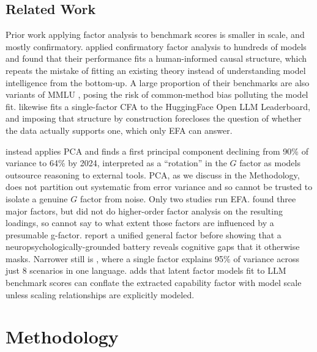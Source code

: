 \documentclass{article} %
\begin{document}
\hypertarget{related-work}{%
\subsection{Related Work}\label{related-work}}

Prior work applying factor analysis to benchmark scores is smaller in scale, and mostly confirmatory. \citet{ilicagignac2024} applied confirmatory factor analysis to hundreds of models and found that
their performance fits a human-informed causal structure, which repeats the mistake of fitting an existing theory instead of understanding model intelligence from the bottom-up. A large proportion of
their benchmarks are also variants of MMLU \citep{hendrycks2021}, posing the risk of common-method bias polluting the model fit. \citet{federiakin2025} likewise fits a single-factor CFA to the
HuggingFace Open LLM Leaderboard, and imposing that structure by construction forecloses the question of whether the data actually supports one, which only EFA can answer.

\citet{krakauer2026} instead applies PCA and finds a first principal component declining from 90\% of variance to 64\% by 2024, interpreted as a ``rotation'' in the \(G\) factor as models outsource
reasoning to external tools. PCA, as we discuss in the Methodology, does not partition out systematic from error variance and so cannot be trusted to isolate a genuine \(G\) factor from noise. Only
two studies run EFA. \citet{burnell2023} found three major factors, but did not do higher-order factor analysis on the resulting loadings, so cannot say to what extent those factors are influenced by
a presumable g-factor. \citet{haznitrama2026} report a unified general factor before showing that a neuropsychologically-grounded battery reveals cognitive gaps that it otherwise masks. Narrower still
is \citet{holm2024}, where a single factor explains 95\% of variance across just 8 scenarios in one language. \citet{kearns2026} adds that latent factor models fit to LLM benchmark scores can conflate
the extracted capability factor with model scale unless scaling relationships are explicitly modeled.

\hypertarget{methodology}{%
\section{Methodology}\label{methodology}}
\end{document}
